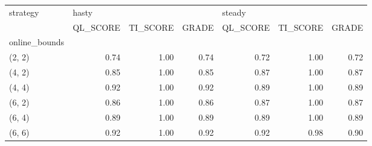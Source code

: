 \begin{tabular}{lrrrrrr}
\toprule
strategy & \multicolumn{3}{l}{hasty} & \multicolumn{3}{l}{steady} \\
{} & QL\_SCORE & TI\_SCORE & GRADE & QL\_SCORE & TI\_SCORE & GRADE \\
online\_bounds &          &          &       &          &          &       \\
\midrule
(2, 2)        &     0.74 &     1.00 &  0.74 &     0.72 &     1.00 &  0.72 \\
(4, 2)        &     0.85 &     1.00 &  0.85 &     0.87 &     1.00 &  0.87 \\
(4, 4)        &     0.92 &     1.00 &  0.92 &     0.89 &     1.00 &  0.89 \\
(6, 2)        &     0.86 &     1.00 &  0.86 &     0.87 &     1.00 &  0.87 \\
(6, 4)        &     0.89 &     1.00 &  0.89 &     0.89 &     1.00 &  0.89 \\
(6, 6)        &     0.92 &     1.00 &  0.92 &     0.92 &     0.98 &  0.90 \\
\bottomrule
\end{tabular}
